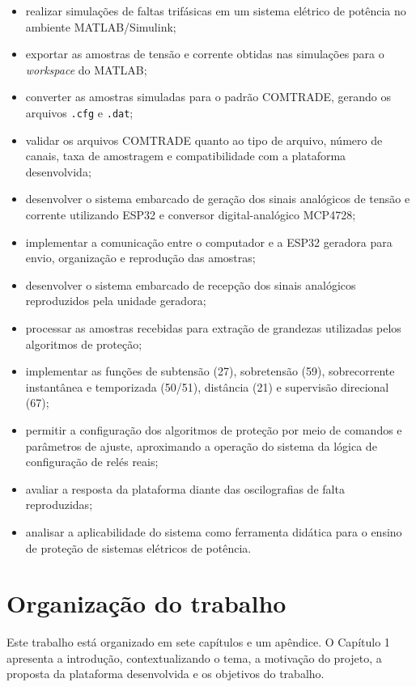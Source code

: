 \begin{itemize}
  \item realizar simulações de faltas trifásicas em um sistema elétrico de potência no ambiente MATLAB/Simulink;
  \item exportar as amostras de tensão e corrente obtidas nas simulações para o \textit{workspace} do MATLAB;
  \item converter as amostras simuladas para o padrão COMTRADE, gerando os arquivos \texttt{.cfg} e \texttt{.dat};
  \item validar os arquivos COMTRADE quanto ao tipo de arquivo, número de canais, taxa de amostragem e compatibilidade com a plataforma desenvolvida;
  \item desenvolver o sistema embarcado de geração dos sinais analógicos de tensão e corrente utilizando ESP32 e conversor digital-analógico MCP4728;
  \item implementar a comunicação entre o computador e a ESP32 geradora para envio, organização e reprodução das amostras;
  \item desenvolver o sistema embarcado de recepção dos sinais analógicos reproduzidos pela unidade geradora;
  \item processar as amostras recebidas para extração de grandezas utilizadas pelos algoritmos de proteção;
  \item implementar as funções de subtensão (27), sobretensão (59), sobrecorrente instantânea e temporizada (50/51), distância (21) e supervisão direcional (67);
  \item permitir a configuração dos algoritmos de proteção por meio de comandos e parâmetros de ajuste, aproximando a operação do sistema da lógica de configuração de relés reais;
  \item avaliar a resposta da plataforma diante das oscilografias de falta reproduzidas;
  \item analisar a aplicabilidade do sistema como ferramenta didática para o ensino de proteção de sistemas elétricos de potência.
\end{itemize}

\section{Organização do trabalho}

Este trabalho está organizado em sete capítulos e um apêndice. O Capítulo 1 apresenta a introdução, contextualizando o tema, a motivação do projeto, a proposta da plataforma desenvolvida e os objetivos do trabalho.

